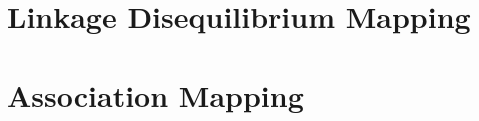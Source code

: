 







\part{Linkage Disequilibrium Mapping}
\label{part:exchangeable}







\part{Association Mapping}
\label{part:nonexchangeable}

% 








